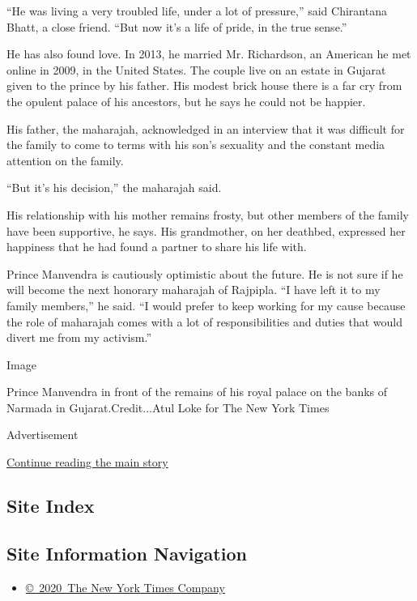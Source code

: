 ``He was living a very troubled life, under a lot of pressure,'' said
Chirantana Bhatt, a close friend. ``But now it's a life of pride, in the
true sense.''

He has also found love. In 2013, he married Mr. Richardson, an American
he met online in 2009, in the United States. The couple live on an
estate in Gujarat given to the prince by his father. His modest brick
house there is a far cry from the opulent palace of his ancestors, but
he says he could not be happier.

His father, the maharajah, acknowledged in an interview that it was
difficult for the family to come to terms with his son's sexuality and
the constant media attention on the family.

``But it's his decision,'' the maharajah said.

His relationship with his mother remains frosty, but other members of
the family have been supportive, he says. His grandmother, on her
deathbed, expressed her happiness that he had found a partner to share
his life with.

Prince Manvendra is cautiously optimistic about the future. He is not
sure if he will become the next honorary maharajah of Rajpipla. ``I have
left it to my family members,'' he said. ``I would prefer to keep
working for my cause because the role of maharajah comes with a lot of
responsibilities and duties that would divert me from my activism.''

Image

Prince Manvendra in front of the remains of his royal palace on the
banks of Narmada in Gujarat.Credit...Atul Loke for The New York Times

Advertisement

\protect\hyperlink{after-bottom}{Continue reading the main story}

\hypertarget{site-index}{%
\subsection{Site Index}\label{site-index}}

\hypertarget{site-information-navigation}{%
\subsection{Site Information
Navigation}\label{site-information-navigation}}

\begin{itemize}
\tightlist
\item
  \href{https://help.nytimes3xbfgragh.onion/hc/en-us/articles/115014792127-Copyright-notice}{©~2020~The
  New York Times Company}
\end{itemize}

